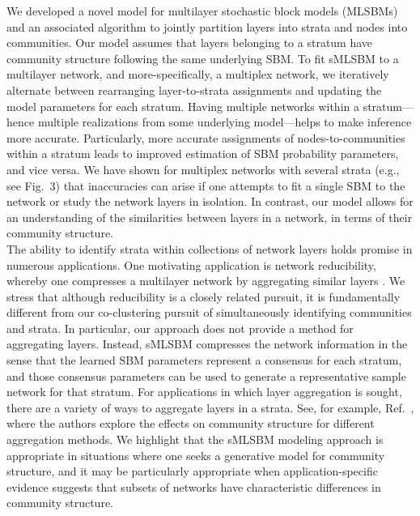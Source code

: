 \indent 
We developed a novel model for multilayer stochastic block models (MLSBMs) and an associated algorithm to jointly partition layers into strata and nodes into communities. Our model assumes that layers belonging to a stratum have community structure following the same underlying SBM. To fit sMLSBM to a multilayer network, and more-specifically, a multiplex network, we iteratively alternate between rearranging layer-to-strata assignments and updating the model parameters for each stratum. Having multiple networks within a stratum---hence multiple realizations from some underlying model---helps to make inference more accurate. Particularly, more accurate assignments of nodes-to-communities within a stratum leads to improved estimation of SBM probability parameters, and vice versa. 
We have shown for multiplex networks with several strata (e.g., see Fig.~3) that inaccuracies can arise if one attempts to fit a single SBM to the network or study the network layers in isolation.
In contrast, our model allows for an understanding of the similarities between layers in a network, in terms of their community structure. 
%
\\\indent
The ability to identify strata within collections of network layers holds promise in numerous applications. 
One motivating application is network reducibility, whereby one compresses a multilayer network by aggregating similar layers \cite{domen}. We stress that although reducibility is a closely related pursuit, it is fundamentally different from our co-clustering pursuit of simultaneously identifying communities and strata. In particular, our approach does not provide a method for aggregating layers. Instead, sMLSBM compresses the network information in the sense that the learned SBM parameters represent a consensus for each stratum, and those consensus parameters can be used to generate a representative sample network for that stratum. For applications in which layer aggregation is sought, there are a variety of ways to aggregate layers in a strata. See, for example, Ref.~\cite{taylor2015enhanced}, where the authors explore the effects on community structure for different aggregation methods. We highlight that the sMLSBM modeling approach is appropriate in situations where one seeks a generative model for community structure, and it may be particularly appropriate when application-specific evidence suggests that subsets of networks have characteristic differences in community structure.
